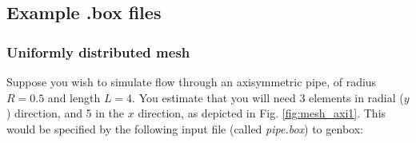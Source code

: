 

\subsection{Example .box files}

\subsubsection{Uniformly distributed mesh}

Suppose you wish to simulate flow through an axisymmetric pipe, of radius
\(R=0.5\) and length \(L=4\).  You estimate that you will need 3 elements in
radial (\(y\)) direction, and 5 in the \(x\) direction, as depicted in Fig.
\ref{fig:mesh_axi1}.  This would be specified by the following input file
(called {\em pipe.box}) to genbox:

